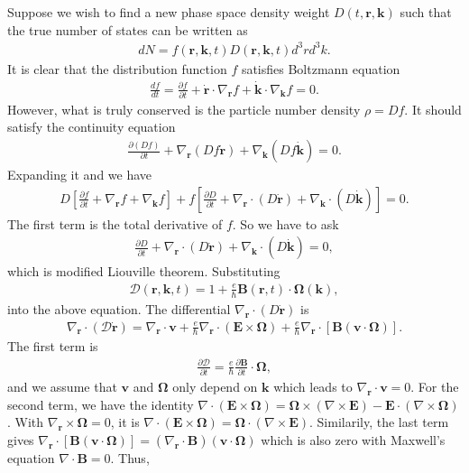 \documentclass[12pt, oneside]{article}
\newcommand{\pa}{\partial}
\newcommand{\p}[1]{\left(#1\right)}
\newcommand{\bb}[1]{\left[#1\right]}
\numberwithin{equation}{subsection}
\begin{document}
Suppose we wish to find a new phase space density weight \(D \p{t,\bm{r}, \bm{k}}\) such that the true number of states can be written as
\begin{align}
	dN=f(\bm r,\bm k,t)D(\bm r,\bm k,t)d^3r d^3k.
\end{align}
It is clear that the distribution function \(f\) satisfies Boltzmann equation 
\begin{align}
	\frac{d f}{d t } = \frac{\partial f}{\partial t} + \dot{\bm r}\cdot\nabla_{\bm r}f + \dot{\bm k}\cdot\nabla_{\bm k}f =0.
\end{align}
However, what is truly conserved is the particle number density \(\rho = D f\). It should satisfy the continuity equation 
\begin{align}
	\frac{\pa \p{Df}}{\pa t} + \nabla_{\bm{r}} \p{Df \dot{\bm{r}}} + \nabla_{\bm{k}} \p{Df \dot{\bm{k}}} = 0.
\end{align}
Expanding it and we have
\begin{align}
	D \bb{\frac{\pa f}{\pa t} + \nabla_{\bm{r}} f + \nabla_{\bm{k}} f} + f \bb{\frac{\pa D}{\pa t} + \nabla_{\bm{r}} \cdot \p{D \dot{\bm{r}}} +  \nabla_{\bm{k}} \cdot \p{D \dot{\bm{k}}}} =0.
\end{align}
The first term is the total derivative of \(f\). So we have to ask 
\begin{align}
	\frac{\pa D}{\pa t} + \nabla_{\bm{r}} \cdot \p{D \dot{\bm{r}}} +  \nabla_{\bm{k}} \cdot \p{D \dot{\bm{k}}} = 0,
\end{align}
which is modified Liouville theorem. Substituting 
\begin{align}
	\boxed{\mathcal{D}\p{\bm{r}, \bm{k}, t}= 1 + \frac{e}{\hbar} \bm{B} \p{\bm{r}, t} \cdot \bm{\Omega}\p{\bm{k}} },
\end{align}
into the above equation. The differential \(\nabla_{\bm{r}} \cdot \p{D \dot{\bm{r}}} \) is 
\begin{align}
	\nabla_{\bm r}\cdot(\mathcal{D} \dot{\bm r}) = \nabla_{\bm r}\cdot\bm v + \frac{e}{\hbar} \nabla_{\bm r}\cdot(\bm E\times\bm\Omega) + \frac{e}{\hbar} \nabla_{\bm r}\cdot[\bm B (\bm v\cdot\bm\Omega)].
\end{align}
The first term is 
\begin{align}
	\frac{\partial \mathcal{D}}{\partial t} = \frac{e}{\hbar} \frac{\partial \bm B}{\partial t} \cdot\bm\Omega,
\end{align}
 and we assume that \(\bm{v}\) and \(\bm{\Omega}\) only depend on \(\bm{k}\) which leads to \(\nabla_{\bm r}\cdot\bm v = 0\). For the second term, we have the identity \(\nabla \cdot \p{\bm{E} \times \bm{\Omega}} = \bm{\Omega} \times \p{\nabla \times \bm{E}} - \bm{E} \cdot \p{\nabla \times \bm{\Omega}}\). With \(\nabla_{\bm{r}} \times \bm{\Omega} = 0\), it is \(\nabla \cdot \p{\bm{E} \times \bm{\Omega}} = \bm{\Omega} \cdot \p{\nabla \times \bm{E}}\). Similarily, the last term gives \(\nabla_{\bm r}\cdot[\bm B (\bm v\cdot\bm\Omega)] = \p{\nabla_{\bm{r}} \cdot \bm{B}} \p{\bm{v} \cdot \bm{\Omega}}\) which is also zero with Maxwell's equation \(\nabla \cdot \bm{B} = 0\). Thus,
\end{document}
